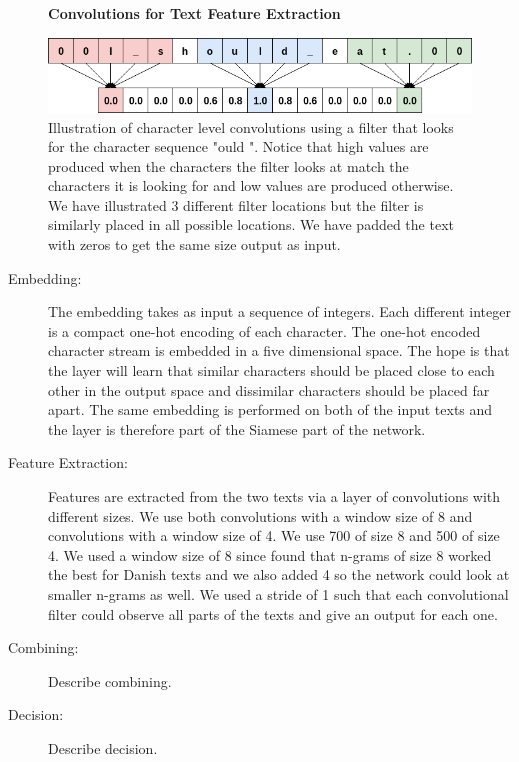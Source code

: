 \begin{figure}
    \centering
    \textbf{Convolutions for Text Feature Extraction}\par\medskip
    \includegraphics[width=\textwidth]{./pictures/experiments/convolution_example.png}
    \caption{Illustration of character level convolutions using a filter that
        looks for the character sequence "ould ". Notice that high values are
        produced when the characters the filter looks at match the characters it
        is looking for and low values are produced otherwise. We have
        illustrated 3 different filter locations but the filter is similarly
        placed in all possible locations. We have padded the text with zeros to
        get the same size output as input.}
    \label{fig:convolution_text_example}
\end{figure}

\begin{description}

    \item[Embedding:]

        The embedding takes as input a sequence of integers. Each different
        integer is a compact one-hot encoding of each character. The one-hot
        encoded character stream is embedded in a five dimensional space. The
        hope is that the layer will learn that similar characters should be
        placed close to each other in the output space and dissimilar characters
        should be placed far apart. The same embedding is performed on both of
        the input texts and the layer is therefore part of the Siamese part of
        the network.

    \item[Feature Extraction:]

        Features are extracted from the two texts via a layer of convolutions
        with different sizes. We use both convolutions with a window size of 8
        and convolutions with a window size of 4. We use 700 of size 8 and 500
        of size 4. We used a window size of 8 since \cite{aalykke2016} found
        that n-grams of size 8 worked the best for Danish texts and we also
        added 4 so the network could look at smaller n-grams as well. We used a
        stride of 1 such that each convolutional filter could observe all parts
        of the texts and give an output for each one.

    \item[Combining:]

        Describe combining.

    \item[Decision:]

        Describe decision.

\end{description}

